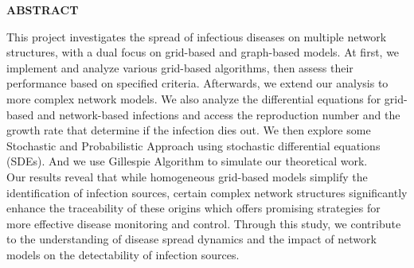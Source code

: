 \begin{center}
    \thispagestyle{empty} %
    \Large \textbf{ABSTRACT}\\[2cm]
\end{center}

\noindent
This project investigates the spread of infectious diseases on multiple network structures, with a dual focus on grid-based and graph-based models. At first, we implement and analyze various grid-based algorithms, then assess their performance based on specified criteria. Afterwards, we extend our analysis to more complex network models. We also analyze the differential equations for grid-based and network-based infections and access the reproduction number and the growth rate that determine if the infection dies out. We then explore some Stochastic and Probabilistic Approach using  stochastic differential equations (SDEs). And we use Gillespie Algorithm to simulate our theoretical work.\\
Our results reveal that while homogeneous grid-based models simplify the identification of infection sources, certain complex network structures significantly enhance the traceability of these origins which offers promising strategies for more effective disease monitoring and control. Through this study, we contribute to the understanding of disease spread dynamics and the impact of network models on the detectability of infection sources.